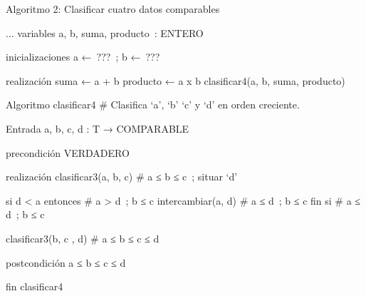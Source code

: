 Algoritmo 2: Clasificar cuatro datos comparables


...
variables
	a, b, suma, producto : ENTERO

inicializaciones
	a ← ??? ; b ← ???

realización
	suma ← a + b
	producto ← a x b
	clasificar4(a, b, suma, producto)


Algoritmo clasificar4
    # Clasifica `a', `b' `c' y `d' en orden creciente.

Entrada
    a, b, c, d : T → COMPARABLE

precondición
    VERDADERO

realización
    clasificar3(a, b, c)
    # a ≤ b ≤ c ; situar `d'

    si
        d < a
    entonces
        # a > d ; b ≤ c
        intercambiar(a, d)
        # a ≤ d ; b ≤ c
    fin si
    # a ≤ d ; b ≤ c

    clasificar3(b, c , d)
    # a ≤ b ≤ c ≤ d

postcondición
    a ≤ b ≤ c ≤ d

fin clasificar4